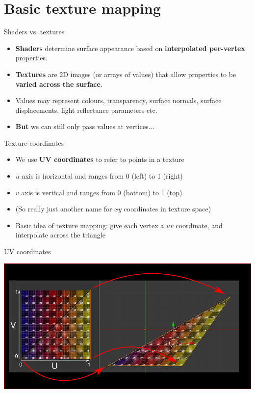 \part{Basic texture mapping}
\frame{\partpage}

\begin{frame}{Shaders vs. textures}
	\begin{itemize}
		\pause\item \textbf{Shaders} determine surface appearance based on \textbf{interpolated per-vertex} properties.
		\pause\item \textbf{Textures} are 2D images (or arrays of values) that allow properties to be \textbf{varied across the surface}.
		\pause\item Values may represent colours, transparency, surface normals, surface displacements, light reflectance parameters etc.
		\pause\item \textbf{But} we can still only pass values at vertices...
	\end{itemize}
\end{frame}

\begin{frame}{Texture coordinates}
	\begin{itemize}
		\item We use \textbf{UV coordinates} to refer to points in a texture
		\pause\item $u$ axis is horizontal and ranges from 0 (left) to 1 (right)
		\pause\item $v$ axis is vertical and ranges from 0 (bottom) to 1 (top)
		\pause\item (So really just another name for $xy$ coordinates in texture space)
		\pause\item Basic idea of texture mapping: give each vertex a $uv$ coordinate, and interpolate across the triangle
	\end{itemize}
\end{frame}

\begin{frame}{UV coordinates}
	\begin{center}
		\includegraphics[width=\textwidth]{uv}
	\end{center}
\end{frame}

